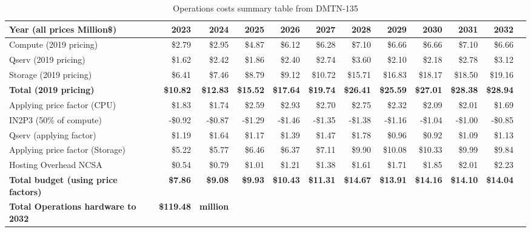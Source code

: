 \tiny \begin{longtable} { |p{}  |r  |r  |r  |r  |r  |r  |r  |r  |r  |r  |r |}
\caption{Operations costs summary table from DMTN-135
 \label{tab:opsSumUSDF}}\\
\hline
\textbf{Year  (all prices Million\$)}&\textbf{2023}&\textbf{2024}&\textbf{2025}&\textbf{2026}&\textbf{2027}&\textbf{2028}&\textbf{2029}&\textbf{2030}&\textbf{2031}&\textbf{2032} \\ \hline
{Compute (2019 pricing)}&{\$2.79}&{\$2.95}&{\$4.87}&{\$6.12}&{\$6.28}&{\$7.10}&{\$6.66}&{\$6.66}&{\$7.10}&{\$6.66} \\ \hline
{Qserv (2019 pricing)}&{\$1.62}&{\$2.42}&{\$1.86}&{\$2.40}&{\$2.74}&{\$3.60}&{\$2.10}&{\$2.18}&{\$2.78}&{\$3.12} \\ \hline
{Storage (2019 pricing)}&{\$6.41}&{\$7.46}&{\$8.79}&{\$9.12}&{\$10.72}&{\$15.71}&{\$16.83}&{\$18.17}&{\$18.50}&{\$19.16} \\ \hline
\textbf{Total (2019 pricing)}&\textbf{\$10.82}&\textbf{\$12.83}&\textbf{\$15.52}&\textbf{\$17.64}&\textbf{\$19.74}&\textbf{\$26.41}&\textbf{\$25.59}&\textbf{\$27.01}&\textbf{\$28.38}&\textbf{\$28.94} \\ \hline
{Applying price factor (CPU)}&{\$1.83}&{\$1.74}&{\$2.59}&{\$2.93}&{\$2.70}&{\$2.75}&{\$2.32}&{\$2.09}&{\$2.01}&{\$1.69} \\ \hline
{IN2P3 (50\% of compute)}&{-\$0.92}&{-\$0.87}&{-\$1.29}&{-\$1.46}&{-\$1.35}&{-\$1.38}&{-\$1.16}&{-\$1.04}&{-\$1.00}&{-\$0.85} \\ \hline
{Qserv (applying factor)}&{\$1.19}&{\$1.64}&{\$1.17}&{\$1.39}&{\$1.47}&{\$1.78}&{\$0.96}&{\$0.92}&{\$1.09}&{\$1.13} \\ \hline
{Applying price factor (Storage)}&{\$5.22}&{\$5.77}&{\$6.46}&{\$6.37}&{\$7.11}&{\$9.90}&{\$10.08}&{\$10.33}&{\$9.99}&{\$9.84} \\ \hline
{Hosting Overhead NCSA
}&{\$0.54}&{\$0.79}&{\$1.01}&{\$1.21}&{\$1.38}&{\$1.61}&{\$1.71}&{\$1.85}&{\$2.01}&{\$2.23} \\ \hline
\textbf{Total budget (using price factors)}&\textbf{\$7.86}&\textbf{\$9.08}&\textbf{\$9.93}&\textbf{\$10.43}&\textbf{\$11.31}&\textbf{\$14.67}&\textbf{\$13.91}&\textbf{\$14.16}&\textbf{\$14.10}&\textbf{\$14.04} \\ \hline
\textbf{Total Operations hardware to 2032 }&\textbf{\$119.48}&\textbf{million}&&&&&&&& \\ \hline
\end{longtable} \normalsize
